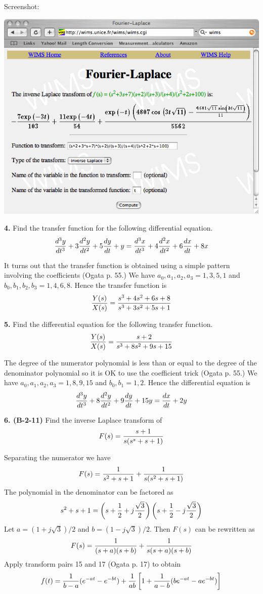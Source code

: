\documentclass[11pt]{report}
\begin{document}
\bigskip
\noindent
Screenshot:
\begin{center}
\includegraphics[scale=0.5]{images/inverse-laplace-tool.png}
\end{center}

\newpage

\noindent
{\bf 4.} Find the transfer function for the following differential
equation.
$${d^3y\over dt^3}+3{d^2y\over dt^2}+5{dy\over dt}+y
={d^3x\over dt^3}+4{d^2x\over dt^2}+6{dx\over dt}+8x$$

\bigskip
\noindent
It turns out that the transfer function is obtained using a simple pattern
involving the coefficients (Ogata p. 55.)
We have
$a_0,a_1,a_2,a_3=1,3,5,1$ and $b_0,b_1,b_2,b_3=1,4,6,8$.
Hence the transfer function is
$${Y(s)\over X(s)}={s^3+4s^2+6s+8\over s^3+3s^2+5s+1}$$

\bigskip
\noindent
{\bf 5.} Find the differential equation for the following transfer function.
$${Y(s)\over X(s)}={s+2\over s^3+8s^2+9s+15}$$

\bigskip
\noindent
The degree of the numerator polynomial is less than or equal to the degree of
the denominator polynomial so it is OK to use the coefficient trick
(Ogata p. 55.)
We have $a_0,a_1,a_2,a_3=1,8,9,15$ and $b_0,b_1=1,2$.
Hence the differential equation is
$${d^3y\over dt^3}+8{d^2y\over dt^2}+9{dy\over dt}+15y
={dx\over dt}+2y$$

\newpage

\noindent
{\bf 6. (B-2-11)} Find the inverse Laplace transform of
$$F(s)={s+1\over s(s^s+s+1)}$$

\bigskip
\noindent
Separating the numerator we have
$$F(s)={1\over s^2+s+1}+{1\over s(s^2+s+1)}$$
The polynomial in the denominator can be factored as
$$s^2+s+1=
\left(s+{1\over2}+j{\sqrt3\over2}\right)
\left(s+{1\over2}-j{\sqrt3\over2}\right)
$$
Let $a=(1+j\sqrt3)/2$ and $b=(1-j\sqrt3)/2$.
Then $F(s)$ can be rewritten as
$$F(s)={1\over(s+a)(s+b)}+{1\over s(s+a)(s+b)}$$
Apply transform pairs 15 and 17 (Ogata p. 17) to obtain
$$f(t)={1\over b-a}(e^{-at}-e^{-bt})+
{1\over ab}\left[1+{1\over a-b}(be^{-at}-ae^{-bt})\right]$$
\end{document}
